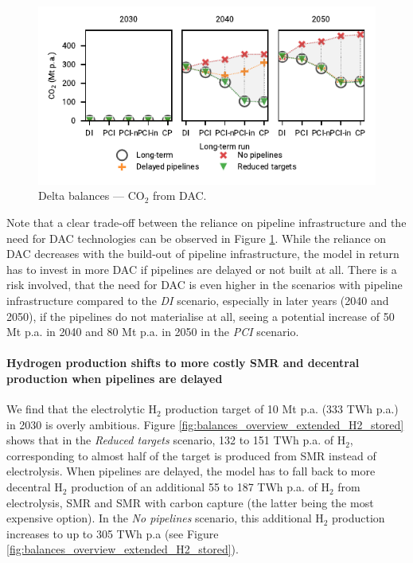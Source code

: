 \documentclass[pdflatex,sn-nature]{sn-jnl}%
\theoremstyle{thmstyleone}%
\theoremstyle{thmstyletwo}%
\theoremstyle{thmstylethree}%
\begin{document}
\begin{figure}[htbp]
  \centering
  \includegraphics{figures/delta_balances_DAC}
  \caption{Delta balances --- CO$_2$ from DAC.}
  \label{fig:delta_balances_dac}
\end{figure}

Note that a clear trade-off between the reliance on pipeline infrastructure and the need for DAC technologies can be observed in Figure \ref{fig:delta_balances_dac}. While the reliance on DAC decreases with the build-out of pipeline infrastructure, the model in return has to invest in more DAC if pipelines are delayed or not built at all. There is a risk involved, that the need for DAC is even higher in the scenarios with pipeline infrastructure compared to the \textit{DI} scenario, especially in later years (2040 and 2050), if the pipelines do not materialise at all, seeing a potential increase of 50 Mt p.a. in 2040 and 80 Mt p.a. in 2050 in the \textit{PCI} scenario.

\paragraph{Hydrogen production shifts to more costly SMR and decentral production when pipelines are delayed} 
We find that the electrolytic H$_2$ production target of 10 Mt p.a. (333 TWh p.a.) in 2030 is overly ambitious. Figure \ref{fig:balances_overview_extended_H2_stored} shows that in the \textit{Reduced targets} scenario, 132 to 151 TWh p.a. of H$_2$, corresponding to almost half of the target is produced from SMR instead of electrolysis. When pipelines are delayed, the model has to fall back to more decentral H$_2$ production of an additional 55 to 187 TWh p.a. of H$_2$ from electrolysis, SMR and SMR with carbon capture (the latter being the most expensive option). In the \textit{No pipelines} scenario, this additional H$_2$ production increases to up to 305 TWh p.a (see Figure \ref{fig:balances_overview_extended_H2_stored}).
\end{document}
